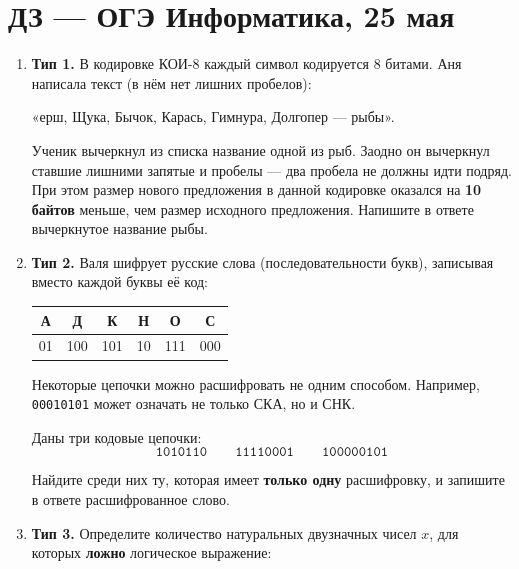 \documentclass[a4paper]{article}
\begin{document}
\Large
\section*{ДЗ — ОГЭ Информатика, 25 мая}

\normalsize\bigskip

\begin{enumerate}[label=\textbf{Задача \arabic*.}, leftmargin=*, itemsep=10mm]

\item \textbf{Тип 1.}
В кодировке КОИ-8 каждый символ кодируется 8 битами. Аня написала текст
(в нём нет лишних пробелов):

\begin{center}
«ерш, Щука, Бычок, Карась, Гимнура, Долгопер — рыбы».
\end{center}

Ученик вычеркнул из списка название одной из рыб. Заодно он вычеркнул
ставшие лишними запятые и пробелы — два пробела не должны идти подряд.
При этом размер нового предложения в данной кодировке оказался на
\textbf{10 байтов} меньше, чем размер исходного предложения.
Напишите в ответе вычеркнутое название рыбы.

\item \textbf{Тип 2.}
Валя шифрует русские слова (последовательности букв), записывая вместо
каждой буквы её код:

\bigskip
\begin{center}
\begin{tabular}{cccccc}
\toprule
А & Д & К & Н & О & С \\
\midrule
01 & 100 & 101 & 10 & 111 & 000 \\
\bottomrule
\end{tabular}
\end{center}
\bigskip

Некоторые цепочки можно расшифровать не одним способом. Например,
\texttt{00010101} может означать не только СКА, но и СНК.

Даны три кодовые цепочки:
\[
  \texttt{1010110} \qquad \texttt{11110001} \qquad \texttt{100000101}
\]

Найдите среди них ту, которая имеет \textbf{только одну} расшифровку,
и запишите в ответе расшифрованное слово.

\item \textbf{Тип 3.}
Определите количество натуральных двузначных чисел $x$, для которых
\textbf{ложно} логическое выражение:


\end{enumerate}
\end{document}

